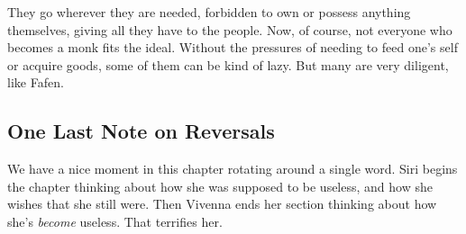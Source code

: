 They go wherever they are needed, forbidden to own or possess anything themselves, giving all they have to the people. Now, of course, not everyone who becomes a monk fits the ideal. Without the pressures of needing to feed one’s self or acquire goods, some of them can be kind of lazy. But many are very diligent, like Fafen.

\subsection*{One Last Note on Reversals}

We have a nice moment in this chapter rotating around a single word. Siri begins the chapter thinking about how she was supposed to be useless, and how she wishes that she still were. Then Vivenna ends her section thinking about how she’s \textit{become} useless. That terrifies her.





